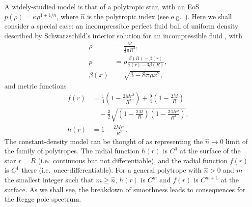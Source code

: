 \documentclass[aps,prd,longbibliography,reprint,twocolumn,amsmath,amssymb,amsfonts,showpacs,footnote,superscriptaddress]{revtex4-1}%
\newcommand{\nn}{\nonumber}
\begin{document}
A widely-studied model is that of a polytropic star, with an EoS $p(\rho) = \kappa \rho^{1+1/\hat{n}}$, where $\hat{n}$ is the polytropic index (see e.g.~\cite{Stratton:2019deq}). Here we shall consider a special case: an incompressible perfect fluid ball of uniform density described by Schwarzschild's interior solution for an incompressible fluid \cite{Shapiro1983}, with
\begin{subequations}
\begin{align}
\rho &= \frac{M}{\frac{4}{3} \pi R^3} , \\
p &= \rho \frac{\beta(R) - \beta(r)}{ \beta(r) - 3 \beta(R)} , \\
\beta(x) &= \sqrt{3 - 8 \pi \rho x^2},
\end{align}
\end{subequations}
and metric functions
%
\begin{subequations}\label{Interior_Solution}
\begin{align}\label{Interior_Solution_f}
 f(r) &= \frac{1}{4}\left(1-\frac{2 M r^2}{R^3}\right)+\frac{9}{4}\left(1-\frac{2M}{R}\right) \nn \\
       & \quad -\frac{3}{2} \sqrt{\left(1-\frac{2M}{R}\right)\left(1-\frac{2 M r^2}{R^3}\right)}, \\
 h(r) &= 1-\frac{2 M r^2}{R^3} . \label{Interior_Solution_h}
\end{align}
\end{subequations}
The constant-density model can be thought of as representing the $\hat{n} \rightarrow 0$ limit of the family of polytropes.
The radial function $h(r)$ is $C^0$ at the surface of the star $r=R$ (i.e.~continuous but not differentiable), and the radial function $f(r)$ is $C^1$ there (i.e.~once-differentiable).
For a general polytrope with $\hat{n}>0$ and $m$ the smallest integer such that $m \geq \hat{n}$, $h(r)$ is $C^m$ and $f(r)$ is $C^{m+1}$ at the surface.
As we shall see, the breakdown of smoothness leads to consequences for the Regge pole spectrum.
\end{document}
